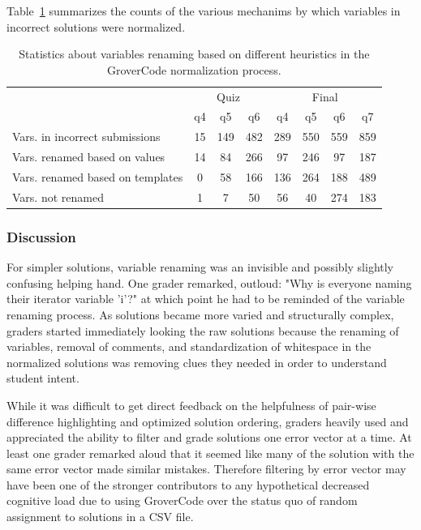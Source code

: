 Table~\ref{table:renametype} summarizes the counts of the various mechanims by which variables in incorrect solutions were normalized.

\begin{table}
\centering
\begin{tabular}{|l|c|c|c|c|c|c|c|}
\hline
& \multicolumn{3}{c|}{Quiz} & \multicolumn{4}{c|}{Final} \\
\cline{2-8}
& q4 & q5 & q6 & q4 & q5 & q6 & q7 \\
\hline
Vars. in incorrect submissions & 15 & 149 & 482 & 289 & 550 & 559 & 859 \\
\hline
Vars. renamed based on values & 14 & 84 & 266 & 97 & 246 & 97 & 187 \\
\hline
Vars. renamed based on templates & 0 & 58 & 166 & 136 & 264 & 188 & 489 \\
\hline
Vars. not renamed & 1 & 7 & 50 & 56 & 40 & 274 & 183 \\
\hline
\end{tabular}
\caption{Statistics about variables renaming based on different heuristics in the GroverCode normalization process.}
\label{table:renametype}
\end{table}
 
\subsubsection{Discussion}
For simpler solutions, variable renaming was an invisible and possibly slightly confusing helping hand. One grader remarked, outloud: "Why is everyone naming their iterator variable 'i'?" at which point he had to be reminded of the variable renaming process. As solutions became more varied and structurally complex, graders started immediately looking the raw solutions because the renaming of variables, removal of comments, and standardization of whitespace in the normalized solutions was removing clues they needed in order to understand student intent.

While it was difficult to get direct feedback on the helpfulness of pair-wise difference highlighting and optimized solution ordering, graders heavily used and appreciated the ability to filter and grade solutions one error vector at a time. At least one grader remarked aloud that it seemed like many of the solution with the same error vector made similar mistakes. Therefore filtering by error vector may have been one of the stronger contributors to any hypothetical decreased cognitive load due to using GroverCode over the status quo of random assignment to solutions in a CSV file.


